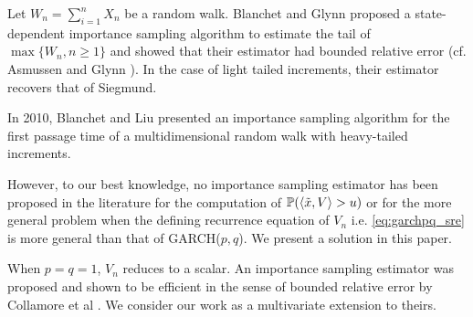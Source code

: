 Let $W_n = \sum_{i=1}^n X_n$ be a random walk. Blanchet and Glynn
\cite{blanchet:glynn:2008}
proposed a state-dependent importance sampling algorithm to estimate
the tail of $\max\{W_n, n \geq 1\}$ and showed that their estimator
had bounded relative error (cf. Asmussen and Glynn
\cite{opac-b1123521}). In the case of light tailed increments, their
estimator recovers that of Siegmund.

In 2010, Blanchet and Liu \cite{blanchet:liu:2010} presented an
importance sampling algorithm for the first passage time of a
multidimensional random walk with heavy-tailed increments.

However, to our best knowledge, no importance sampling
estimator has been proposed in the literature for the computation of
$\mathbb{P}(\langle\tilde x, V\rangle > u)$ or for the more general problem when the
defining recurrence equation of $V_n$ i.e. \eqref{eq:garchpq_sre} is 
more general than that of GARCH($p, q$). We present a solution in this
paper.

When $p = q = 1$, $V_n$ reduces to a scalar. An importance sampling
estimator was proposed and shown to be efficient in the sense of
bounded relative error by Collamore et al \cite{collamore2014}. We
consider our work as a multivariate extension to theirs.

